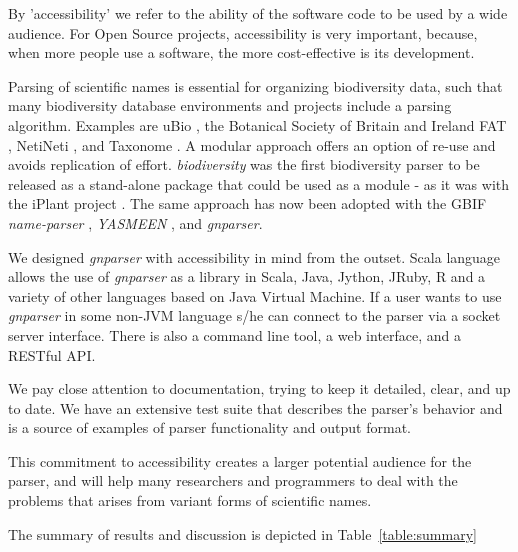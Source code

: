 \documentclass{bmcart}
\begin{document}
By 'accessibility' we refer to the ability of the software code to be used by a wide
audience. For Open Source projects, accessibility is very important, because, when more people use a software, the more cost-effective is its development.

Parsing of scientific names is essential for organizing biodiversity data, such that many biodiversity database environments and projects include a parsing algorithm.  Examples
are uBio \cite{ubio:parser}, the Botanical Society of Britain and Ireland
\cite{botsociety:parser} FAT \cite{Sautter2006}, NetiNeti \cite{Akella2012}, and Taxonome \cite{Kluyver2013}. A modular approach offers an option of re-use and avoids replication of effort. \textit{biodiversity} was the first biodiversity parser to be released as a stand-alone package that could be used as a module - as it was with the iPlant project \cite{Boyle2013}. The same approach has now been adopted with the GBIF \textit{name-parser}
\cite{gbifNameParser}, \textit{YASMEEN} \cite{VandenBerghe2015}, and
\textit{gnparser}.

We designed \textit{gnparser} with accessibility in mind from the outset. Scala
language allows the use of \textit{gnparser} as a library in Scala, Java,
Jython, JRuby, R and a variety of other languages based on
Java Virtual Machine. If a user wants to use \textit{gnparser}  in some non-JVM
language s/he can connect to the parser via a socket server interface. There is
also a command line tool, a web interface, and a RESTful API.

We pay close attention to documentation, trying to keep it detailed, clear, and
up to date. We have an extensive test suite that describes the parser's behavior
and is a source of examples of parser functionality and output
format.

This commitment to accessibility creates a larger potential audience for the parser, and will help
many researchers and programmers to deal with the  problems that arises from variant forms of scientific names.

The summary of results and discussion is depicted in
Table~\ref{table:summary}
\end{document}
